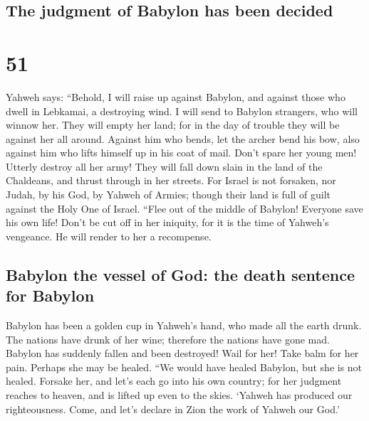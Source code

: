 \begin{paracol}{2}
\switchcolumn
\begin{otherlanguage}{english}

\hypertarget{the-judgment-of-babylon-has-been-decided}{%
\subsection{The judgment of Babylon has been
decided}\label{the-judgment-of-babylon-has-been-decided}}

\hypertarget{section-101}{%
\section{51}\label{section-101}}

 Yahweh says: ``Behold, I will raise up against Babylon,
and against those who dwell in Lebkamai, a destroying wind.
 I will send to Babylon strangers, who will winnow her.
They will empty her land; for in the day of trouble they will be against
her all around.  Against him who bends, let the archer
bend his bow, also against him who lifts himself up in his coat of mail.
Don't spare her young men! Utterly destroy all her army! 
They will fall down slain in the land of the Chaldeans, and thrust
through in her streets.  For Israel is not forsaken, nor
Judah, by his God, by Yahweh of Armies; though their land is full of
guilt against the Holy One of Israel.  ``Flee out of the
middle of Babylon! Everyone save his own life! Don't be cut off in her
iniquity, for it is the time of Yahweh's vengeance. He will render to
her a recompense.

\hypertarget{babylon-the-vessel-of-god-the-death-sentence-for-babylon}{%
\subsection{Babylon the vessel of God: the death sentence for
Babylon}\label{babylon-the-vessel-of-god-the-death-sentence-for-babylon}}

 Babylon has been a golden cup in Yahweh's hand, who made
all the earth drunk. The nations have drunk of her wine; therefore the
nations have gone mad.  Babylon has suddenly fallen and
been destroyed! Wail for her! Take balm for her pain. Perhaps she may be
healed.  ``We would have healed Babylon, but she is not
healed. Forsake her, and let's each go into his own country; for her
judgment reaches to heaven, and is lifted up even to the skies.
 `Yahweh has produced our righteousness. Come, and let's
declare in Zion the work of Yahweh our God.'


\end{otherlanguage}
\end{paracol}
